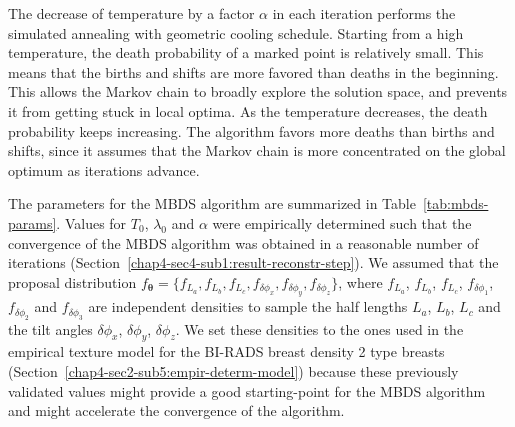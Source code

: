 \documentclass[journal]{IEEEtran}
\begin{document}
The decrease of temperature by a factor $\alpha$ in each iteration
performs the simulated annealing \cite{kirkpatrick1983optimization}
with geometric cooling schedule. Starting from a high temperature, the
death probability of a marked point is relatively small. This means
that the births and shifts are more favored than deaths in the
beginning. This allows the Markov chain to broadly explore the
solution space, and prevents it from getting stuck in local optima. As
the temperature decreases, the death probability keeps increasing. The
algorithm favors more deaths than births and shifts, since it assumes
that the Markov chain is more concentrated on the global optimum as
iterations advance.

The parameters for the MBDS algorithm are summarized in
Table~\ref{tab:mbds-params}. Values for $T_0$, $\lambda_0$ and
$\alpha$ were empirically determined such that the convergence of the
MBDS algorithm was obtained in a reasonable number of iterations
(Section~\ref{chap4-sec4-sub1:result-reconstr-step}). We assumed that
the proposal distribution
$f_{\boldsymbol{\theta}} = \{ f_{L_a}, f_{L_b}, f_{L_c},
f_{\delta{\phi_x}}, f_{\delta{\phi_y}}, f_{\delta{\phi_z}} \}$, where
$f_{L_a}$, $f_{L_b}$, $f_{L_c}$, $f_{\delta{\phi_1}}$,
$f_{\delta{\phi_2}}$ and $f_{\delta{\phi_3}}$ are independent
densities to sample the half lengths $L_a$, $L_b$, $L_c$ and the tilt
angles $\delta{\phi_x}$, $\delta{\phi_y}$, $\delta{\phi_z}$.  We set
these densities to the ones used in the empirical texture model for
the BI-RADS breast density 2 type breasts
(Section~\ref{chap4-sec2-sub5:empir-determ-model}) because these
previously validated values might provide a good starting-point for
the MBDS algorithm and might accelerate the convergence of the
algorithm.
\end{document}

